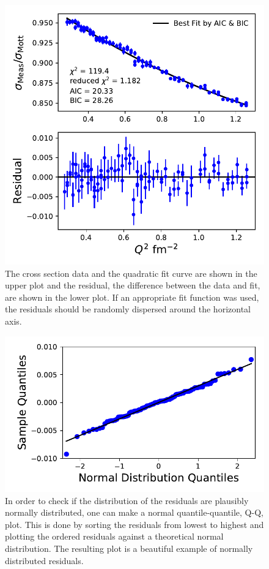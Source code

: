 \documentclass[10pt,aps,prc,twocolumn]{revtex4-1}
\begin{document}
\begin{figure}[htb]
\includegraphics[width=\columnwidth]{Figure/NewVsOld.pdf}
\caption{The cross section data and the quadratic fit curve are shown in the upper plot and the residual, the difference between
the data and fit, are shown in the lower plot.    If an appropriate fit function was used, the residuals should be randomly
dispersed around the horizontal axis.}
\label{residual}
\end{figure}

\begin{figure}[htb]
\includegraphics[width=\columnwidth]{Figure/NormQQ.pdf}
\caption{In order to check if the distribution of the residuals are plausibly normally distributed, one can make a normal
 quantile-quantile, Q-Q, plot.
This is done by sorting the residuals from lowest to highest and plotting the ordered residuals against a theoretical 
normal distribution.   The resulting plot is a beautiful example of normally distributed residuals.}
\label{normqq}
\end{figure}
\end{document}
